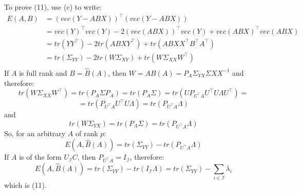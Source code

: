 To prove (11), use (c) to write:
\[
    \begin{split}
        E(A,B) &= (vec(Y - ABX))^\intercal(vec(Y - ABX))\\
        &= vec(Y)^\intercal vec(Y) - 2(vec(ABX))^\intercal vec(Y) + vec(ABX)^\intercal vec(ABX)\\
        &= tr(YY^\intercal) - 2tr(ABXY^\intercal) + tr(ABXX^\intercal B^\intercal A^\intercal)\\
        &= tr(\Sigma_{YY}) - 2tr(W\Sigma_{XY}) + tr(W\Sigma_{XX}W^\intercal)\\
    \end{split}
\]
If $A$ is full rank and $B = \hat{B}(A)$, then $W = AB(A) = P_A\Sigma_{YX}\Sigma{XX}^{-1}$ and therefore:
\[
    tr(W\Sigma_{XX}W^\intercal) = tr(P_A \Sigma P_A) = tr(P_A \Sigma) = tr(U P_{U^\intercal A} U^\intercal U \Lambda U^\intercal) =    
\]  
\[
    = tr(P_{U^\intercal A} U^\intercal U \Lambda) = tr(P_{U^\intercal A} \Lambda) 
\]
and 
\[
    tr(W\Sigma_{YX}) = tr(P_A\Sigma) = tr(P_{U^\intercal A}\Lambda)    
\]
So, for an arbitrary $A$ of rank $p$:
\[
    E(A,\hat{B}(A)) = tr(\Sigma_{YY})  - tr(P_{U^\intercal A}\Lambda)
\]
If $A$ is of the form $U_{\mathcal{I}}C$, then $P_{U^\intercal A} = I_{\mathcal{I}}$, therefore:
\[
    E(A,\hat{B}(A)) = tr(\Sigma_{YY}) - tr(I_{\mathcal{I}}\Lambda) = tr(\Sigma_{YY}) - \sum_{i \in \mathcal{I}} \lambda_i
\]
which is (11). 

